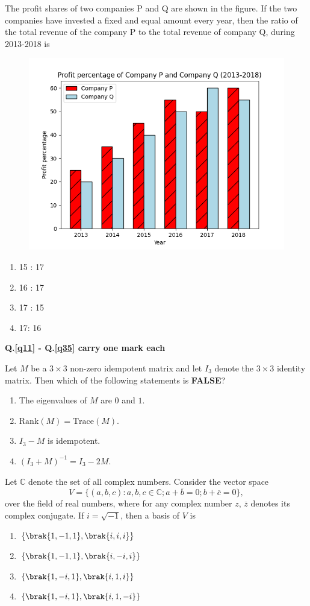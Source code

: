 \item \label{q10} The profit shares of two companies P and Q are shown in the figure. If the two companies have invested a fixed and equal amount every year, then the ratio of the total revenue of the company P to the total revenue of company Q, during 2013-2018 is \underline{\hspace{2cm}}
\begin{figure}[h!]
    \centering
    \includegraphics[width=0.5\linewidth]{figs/ST-2015/ST-2022.png} 
\end{figure}
\begin{enumerate}
    \item 15 : 17
    \item 16 : 17
    \item 17 : 15
    \item 17: 16
\end{enumerate}


\textbf{Q.\ref{q11} - Q.\ref{q35} carry one mark each}
\item \label{q11}
    Let $M$ be a $3 \times 3$ non-zero idempotent matrix and let $I_3$ denote the $3 \times 3$ identity matrix. Then which of the following statements is \textbf{FALSE}?
\begin{enumerate}
    \item The eigenvalues of $M$ are $0$ and $1$.
    \item $\text{Rank}(M) = \text{Trace}(M)$.
    \item $I_3 - M$ is idempotent.
    \item $(I_3 + M)^{-1} = I_3 - 2M$.
\end{enumerate}

\item
Let $\mathbb{C}$ denote the set of all complex numbers. Consider the vector space
\[
V = \{(a, b, c) : a, b, c \in \mathbb{C} ;  a + \overline{b} = 0 ;  b + \overline{c} = 0 \},
\]
over the field of real numbers, where for any complex number $z$, $\overline{z}$ denotes its complex conjugate. If $i = \sqrt{-1}$, then a basis of $V$ is
\begin{enumerate}
    \item $\{\brak{1, -1, 1}, \brak{i, i, i}\}$
    \item $\{\brak{1, -1, 1}, \brak{i, -i, i}\}$
    \item $\{\brak{1, -i, 1}, \brak{i, 1, i}\}$
    \item $\{\brak{1, -i, 1}, \brak{i, 1, -i}\}$
\end{enumerate}

